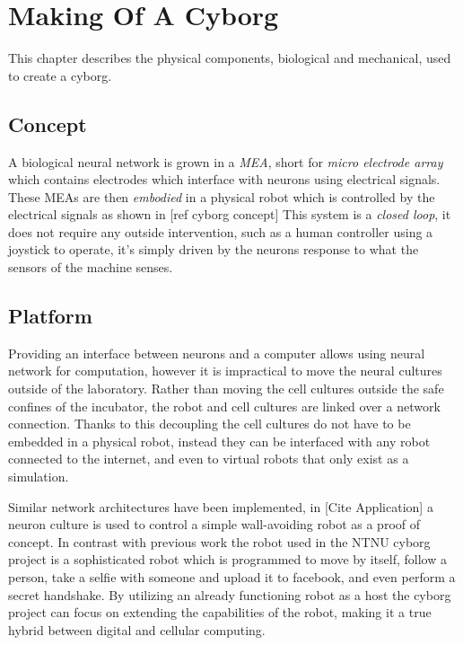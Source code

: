 \chapter{Making Of A Cyborg}
This chapter describes the physical components, biological and mechanical, used
to create a cyborg.
\section{Concept}
A biological neural network is grown in a \textit{MEA}, short for \textit{micro electrode
 array} which contains electrodes which interface with neurons using electrical signals.
These MEAs are then \emph{embodied} in a physical robot which is controlled by
the electrical signals as shown in [ref cyborg concept] This system is a
\textit{closed loop}, it does not require any outside intervention, such as a
human controller using a joystick to operate, it's simply driven by the neurons
response to what the sensors of the machine senses.
\section{Platform}
Providing an interface between neurons and a computer allows using neural
network for computation, however it is impractical to move the neural cultures
outside of the laboratory. Rather than moving the cell cultures outside the safe
confines of the incubator, the robot and cell cultures are linked over a network
connection.
Thanks to this decoupling the cell cultures do not have to be embedded in a
physical robot, instead they can be interfaced with any robot connected to the
internet, and even to virtual robots that only exist as a simulation.

Similar network architectures have been implemented, in
[Cite Application] a neuron culture is used to control a simple
wall-avoiding robot as a proof of concept.
In contrast with previous work the robot used in the NTNU cyborg project is a
sophisticated robot which is programmed to move by itself, follow a person, take a selfie
with someone and upload it to facebook, and even perform a secret handshake.
By utilizing an already functioning robot as a host the cyborg project can focus
on extending the capabilities of the robot, making it a true hybrid between
digital and cellular computing.
